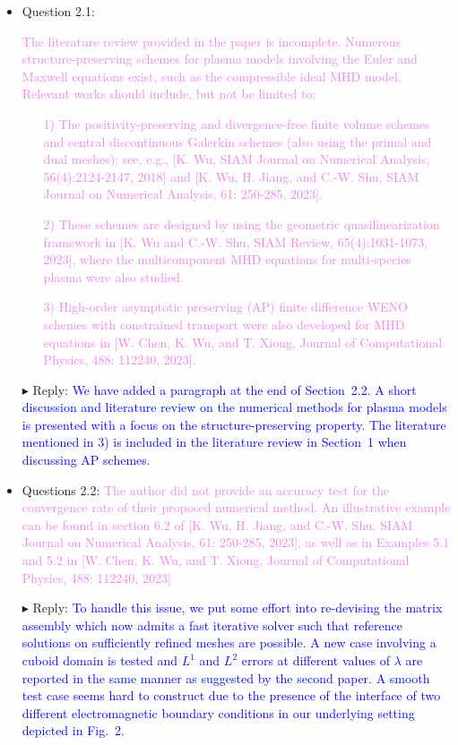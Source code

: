 \documentclass[a4paper, 10pt]{letter}
\begin{document}
\begin{itemize}
  \item Question 2.1: \textcolor{violet}{The literature review provided in the paper is incomplete.
  Numerous structure-preserving schemes for plasma models involving the Euler
  and Maxwell equations exist, such as the compressible ideal MHD model.
  Relevant works should include, but not be limited to:
  \begin{itemize}
      \item[1)] The positivity-preserving and divergence-free finite volume schemes and
  central discontinuous Galerkin schemes (also using the primal and dual meshes);
  see, e.g., [K. Wu, SIAM Journal on Numerical Analysis, 56(4):2124-2147, 2018]
  and [K. Wu, H. Jiang, and C.-W. Shu, SIAM Journal on Numerical Analysis, 61: 250-285, 2023].
      \item[2)] These schemes are designed by using the geometric quasilinearization framework in
  [K. Wu and C.-W. Shu, SIAM Review, 65(4):1031-1073, 2023],
  where the multicomponent MHD equations for multi-species plasma were also studied.
      \item[3)] High-order asymptotic preserving (AP) finite difference WENO schemes with
  constrained transport were also developed for MHD equations in
  [W. Chen, K. Wu, and T. Xiong, Journal of Computational Physics, 488: 112240, 2023].
  \end{itemize}}

  \item[$\blacktriangleright$] Reply: \textcolor{blue}{
  We have added a paragraph at the end of Section~2.2. A short discussion and literature
  review on the numerical methods for plasma models is presented with a focus on the
  structure-preserving property. The literature mentioned in 3) is included in the
  literature review in Section~1 when discussing AP schemes.
  }

  \item Questions 2.2: \textcolor{violet}{The author did not provide an accuracy test
  for the convergence rate of their proposed numerical method.
  An illustrative example can be found in section 6.2 of
  [K. Wu, H. Jiang, and C.-W. Shu, SIAM Journal on Numerical Analysis, 61: 250-285, 2023],
  as well as in Examples 5.1 and 5.2 in [W. Chen, K. Wu, and T. Xiong, Journal of Computational Physics, 488: 112240, 2023]}
  \item[$\blacktriangleright$] Reply: \textcolor{blue}{
  To handle this issue, we put some effort into re-devising the matrix assembly which
  now admits a fast iterative solver such that reference solutions on sufficiently refined
  meshes are possible. A new case involving a cuboid domain is tested and
  $L^1$ and $L^2$ errors at different values of $\lambda$ are reported in the same manner as suggested by the second paper.
  A smooth test case seems hard to construct due to the presence of the interface of two different
  electromagnetic boundary conditions in our underlying setting depicted in Fig.~2.
  }


\end{itemize}
\end{document}
